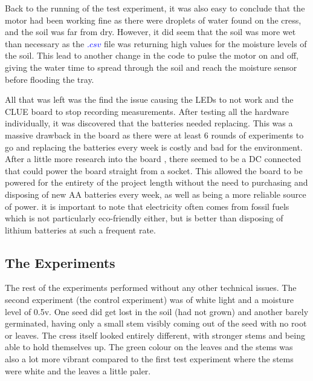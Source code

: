 Back to the running of the test experiment, it was also easy to conclude that the motor had been working fine as there were droplets of water found on the cress, and the soil was far from dry. However, it did seem that the soil was more wet than necessary as the \textcolor{blue}{$.csv$} file was returning high values for the moisture levels of the soil. This lead to another change in the code to pulse the motor on and off, giving the water time to spread through the soil and reach the moisture sensor before flooding the tray.

All that was left was the find the issue causing the LEDs to not work and the CLUE board to stop recording measurements. After testing all the hardware individually, it was discovered that the batteries needed replacing. This was a massive drawback in the board as there were at least 6 rounds of experiments to go and replacing the batteries every week is costly and bad for the environment. After a little more research into the board \cite{kitronikBoard}, there seemed to be a DC connected that could power the board straight from a socket. This allowed the board to be powered for the entirety of the project length without the need to purchasing and disposing of new AA batteries every week, as well as being a more reliable source of power. it is important to note that electricity often comes from fossil fuels which is not particularly eco-friendly either, but is better than disposing of lithium batteries at such a frequent rate.

\subsection{The Experiments}

The rest of the experiments performed without any other technical issues. The second experiment (the control experiment) was of white light and a moisture level of 0.5v. One seed did get lost in the soil (had not grown) and another barely germinated, having only a small stem visibly coming out of the seed with no root or leaves. The cress itself looked entirely different, with stronger stems and being able to hold themselves up. The green colour on the leaves and the stems was also a lot more vibrant compared to the first test experiment where the stems were white and the leaves a little paler.


